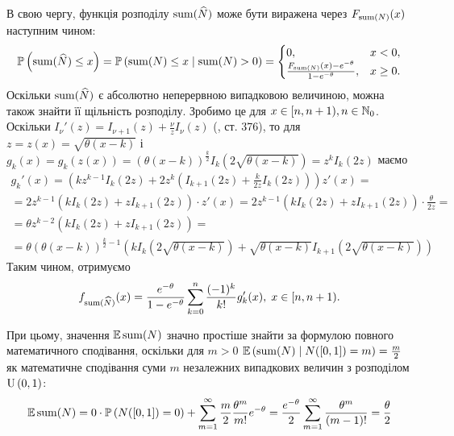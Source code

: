 В свою чергу, функція розподілу $\operatorname{sum}(\widehat{N})$ 
може бути виражена через $F_{\operatorname{sum}(N)}(x)$ наступним чином:
\begin{gather}
    \mathbb{P}\left(\operatorname{sum}(\widehat{N}) \leq x\right) = \mathbb{P}\left(\operatorname{sum}(N) \leq x \mid \operatorname{sum}(N) > 0\right) = 
    \begin{cases}
        0, & x < 0, \\
        \frac{F_{\operatorname{sum}(N)}(x) - e^{-\theta}}{1-e^{-\theta}}, & x \geq 0.
    \end{cases}
\end{gather}
Оскільки $\operatorname{sum}(\widehat{N})$ є абсолютно неперервною випадковою величиною, можна також знайти
її щільність розподілу. Зробимо це для $x \in [n, n+1), n \in \mathbb{N}_0$. Оскільки
$I_{\nu} ' (z) = I_{\nu+1} (z) + \frac{\nu}{z} I_{\nu} (z)$ (\cite{Abramowitz_Stegun}, ст. 376),
то для $z = z(x) = \sqrt{\theta(x-k)}$ і 
$g_k(x) = g_k(z(x)) = \left(\theta (x - k)\right)^{\frac{k}{2}} I_k\left(2\sqrt{\theta(x-k)}\right) = z^k I_k(2z)$
маємо
\begin{gather*}
    g_k'(x) = \left(
        k z^{k-1} I_k(2z) + 2 z^k \left(I_{k+1}(2z) + \frac{k}{2z} I_k(2z)\right)
    \right) z'(x) = \\ =
    2 z^{k-1} \left(k I_k(2z) + z I_{k+1}(2z)\right) \cdot z'(x) = 
    2 z^{k-1} \left(k I_k(2z) + z I_{k+1}(2z)\right) \cdot \frac{\theta}{2 z} = \\ =
    \theta z^{k-2} \left(k I_k(2z) + z I_{k+1}(2z)\right) = \\ =
    \theta \left(\theta (x - k)\right)^{\frac{k}{2}-1}
    \left(
        k I_k \left(2 \sqrt{\theta (x - k)} \right) + 
        \sqrt{\theta (x - k)} I_{k+1} \left(2 \sqrt{\theta (x - k)}\right)
    \right)
\end{gather*}
Таким чином, отримуємо
\begin{gather}
    f_{\operatorname{sum}(\widehat{N})}(x) = \frac{e^{-\theta}}{1 - e^{-\theta}} \sum_{k=0}^{n} \frac{(-1)^k}{k!} g_k'(x), \; x \in [n, n+1).
\end{gather}

При цьому, значення $\mathbb{E}\operatorname{sum}(N)$ значно простіше знайти
за формулою повного математичного сподівання,
оскільки для $m > 0$ $\mathbb{E}\left(\operatorname{sum}(N) \mid N([0, 1]) = m\right) = \frac{m}{2}$
як математичне сподівання суми $m$ незалежних випадкових величин
з розподілом $\mathrm{U}\left(0, 1\right)$:
\begin{gather*}
    \mathbb{E}\operatorname{sum}(N) = 0\cdot \mathbb{P}\left(N([0, 1]) = 0\right) +
    \sum_{m=1}^{\infty} \frac{m}{2} \frac{\theta^m}{m!} e^{-\theta} =
    \frac{e^{-\theta}}{2}\sum_{m=1}^{\infty} \frac{\theta^m}{(m-1)!} = \frac{\theta}{2}
\end{gather*}

